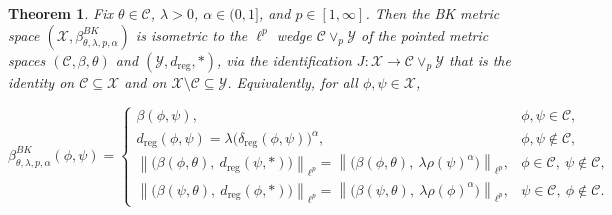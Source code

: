 \documentclass[11pt]{amsart}
\newtheorem{theorem}{Theorem}[section]
\theoremstyle{definition}
\theoremstyle{remark}
\newcommand{\1}{\mathbbm{1}}
\newcommand{\norm}[1]{\left\lVert #1\right\rVert}
\begin{document}
\begin{theorem}
\label{thm:BK-lp-wedge}
Fix $\theta\in\mathcal C$, $\lambda>0$, $\alpha\in(0,1]$, and $p\in[1,\infty]$. Then the BK metric space $(\mathcal X, \beta^{BK}_{\theta,\lambda,p,\alpha})$ is isometric to the $\ell^p$ wedge  $\mathcal C\vee_p\mathcal Y$ of the pointed metric spaces $(\mathcal C,\beta,\theta)$
and $(\mathcal Y,d_{\mathrm{reg}},\ast)$,
via the identification $J:\mathcal X\to \mathcal C\vee_p\mathcal Y$ that is the identity on $\mathcal C\subseteq\mathcal X$ and on $\mathcal X\setminus\mathcal C\subseteq\mathcal Y$. Equivalently, for all $\phi,\psi\in\mathcal X$,

$$
\beta^{BK}_{\theta,\lambda,p,\alpha}(\phi,\psi)=
\begin{cases}
\beta(\phi,\psi), & \phi,\psi\in\mathcal C,\\[1mm]
d_{\mathrm{reg}}(\phi,\psi)=\lambda\bigl(\delta_{\mathrm{reg}}(\phi,\psi)\bigr)^\alpha, & \phi,\psi\notin\mathcal C,\\[1mm]
\norm{\bigl(\beta(\phi,\theta),\ d_{\mathrm{reg}}(\psi,\ast)\bigr)}_{\ell^p}
=\norm{\bigl(\beta(\phi,\theta),\ \lambda\rho(\psi)^\alpha\bigr)}_{\ell^p},
& \phi\in\mathcal C,\ \psi\notin\mathcal C,\\[1mm]
\norm{\bigl(\beta(\psi,\theta),\ d_{\mathrm{reg}}(\phi,\ast)\bigr)}_{\ell^p}
=\norm{\bigl(\beta(\psi,\theta),\ \lambda\rho(\phi)^\alpha\bigr)}_{\ell^p},
& \psi\in\mathcal C,\ \phi\notin\mathcal C.
\end{cases}
$$
\end{theorem}
\end{document}
